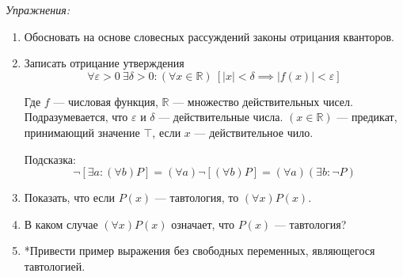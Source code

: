{\it Упражнения:}
\begin{enumerate}
	\item{}Обосновать на основе словесных рассуждений законы отрицания
	кванторов\label{ex:quantor_neg_def}.
	\item{}Записать отрицание утверждения
	\[
		\forall \varepsilon>0~\exists \delta>0:
		(\forall x\in\mathbb{R})~[|x|<\delta\implies |f(x)|<\varepsilon]
	\]

	Где $f$ --- числовая функция, $\mathbb{R}$ --- множество действительных чисел.
	Подразумевается, что $\varepsilon$ и $\delta$ --- действительные числа.
	${(x\in\mathbb{R})}$ --- предикат, принимающий значение $\top$,
	если $x$ --- действительное чило.

	Подсказка:
	\[
		\lnot[\exists a:(\forall b)P]=(\forall a)\lnot[(\forall b)P]=
		(\forall a)(\exists b:\lnot P)
	\]

	\item{}Показать, что если $P(x)$ --- тавтология, то $(\forall x)P(x)$.

	\item{}В каком случае $(\forall x)P(x)$ означает, что $P(x)$ --- тавтология?

	\item{}*Привести пример выражения без свободных переменных,
	являющегося тавтологией.
\end{enumerate}
